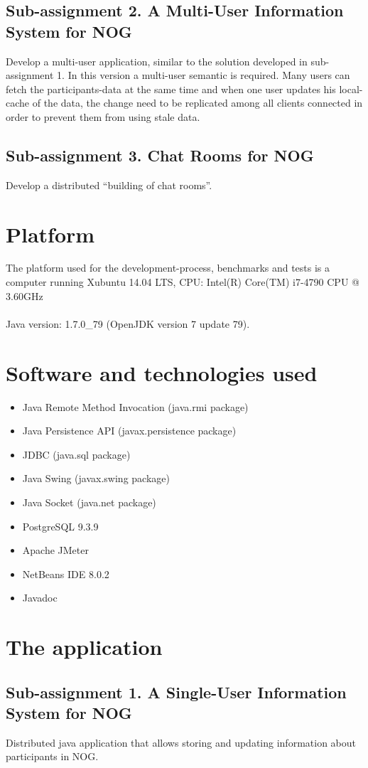 \documentclass[a4paper, 11pt]{article}
\begin{document}
\subsection{Sub-assignment 2. A Multi-User Information System for NOG}
Develop a multi-user application, similar to the solution developed in sub-assignment 1. In this version a multi-user semantic is required. Many users can fetch the participants-data at the same time and when one user updates his local-cache of the data, the change need to be replicated among all clients connected in order to prevent them from using stale data.
\subsection{Sub-assignment 3. Chat Rooms for NOG}
Develop a distributed ``building of chat rooms''.

\newpage
\section{Platform}
The platform used for the development-process, benchmarks and tests is a computer running Xubuntu 14.04 LTS, CPU: Intel(R) Core(TM) i7-4790 CPU @ 3.60GHz \\ \\
Java version: 1.7.0\_79  (OpenJDK version 7 update 79).
\section{Software and technologies used}
\begin{itemize}
\item Java Remote Method Invocation (java.rmi package)
\item Java Persistence API (javax.persistence package)
\item JDBC (java.sql package)
\item Java Swing (javax.swing package)
\item Java Socket (java.net package)
\item PostgreSQL 9.3.9
\item Apache JMeter
\item NetBeans IDE 8.0.2
\item Javadoc
\end{itemize}
\newpage
\section{The application}
\subsection{Sub-assignment 1. A Single-User Information System for NOG}
Distributed java application that allows storing and updating information about participants in NOG. 
\end{document}
